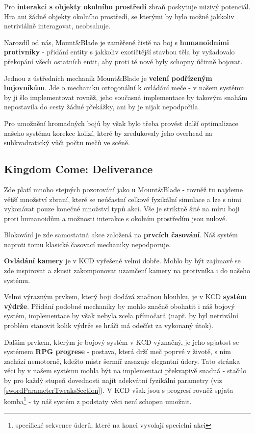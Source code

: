 Pro \textbf{interakci s objekty okolního prostředí} zbraň poskytuje mizivý potenciál. Hra ani žádné objekty okolního prostředí, se kterými by bylo možné jakkoliv netriviálně interagovat, neobsahuje.

Narozdíl od nás, Mount\&Blade je zaměřené čistě na boj s \textbf{humanoidními protivníky} - přidání entity s jakkoliv exotičtější stavbou těla by vyžadovalo překopání všech ostatních entit, aby proti té nové byly schopny účinně bojovat.


Jednou z ústředních mechanik Mount\&Blade je \textbf{velení podřízeným bojovníkům}. Jde o mechaniku ortogonální k ovládání meče - v našem systému by ji šlo implementovat rovněž, jeho současná implementace by takovým snahám nepostavila do cesty žádné překážky, ani by je nijak nepodpořila.

Pro umožnění hromadných bojů by však bylo třeba provést další optimalizace našeho systému korekce kolizí, které by zredukovaly jeho overhead na subkvadratický vůči počtu mečů ve scéně. 




\subsection{Kingdom Come: Deliverance}

Zde platí mnoho stejných pozorování jako u Mount\&Blade - rovněž tu najdeme větší množství zbraní, které se neúčastní celkové fyzikální simulace a lze s nimi vykonávat pouze konečné množství typů akcí. Vše je striktně šité na míru boji proti humanoidům a možnosti interakce s okolním prostředím jsou nulové.

Blokování je zde samostatná akce založená na \textbf{prvcích časování}. Náš systém naproti tomu klasické časovací mechaniky nepodporuje.

\textbf{Ovládání kamery} je v \acl{KCD} vyřešené velmi dobře. Mohlo by být zajímavé se zde inspirovat a zkusit zakomponovat uzamčení kamery na protivníka i do našeho systému.

Velmi výrazným prvkem, který boji dodává značnou hloubku, je v \acl{KCD} \textbf{systém výdrže}. Přidání podobné mechaniky by mohlo značně obohatit i náš bojový systém, implementace by však nebyla zcela přímočará (např. by byl netrivální problém stanovit kolik výdrže se hráči má odečíst za vykonaný útok).

Dalším prvkem, kterým je bojový systém v \acl{KCD} význačný, je jeho spjatost se systémem \textbf{\acs{RPG} progrese} - postava, která drží meč poprvé v životě, s ním zachází nemotorně, kdežto mistr šermíř zasazuje elegantní údery. Tato stránka věci by v našem systému mohla být na implementaci překvapivě snadná - stačilo by pro každý stupeň dovednosti najít adekvátní fyzikální parametry (viz \ref{swordParameterTweaksSection}). V \acl{KCD} však jsou s progresí rovněž spjata komba\footnote{specifické sekvence úderů, které na konci vyvolají specielní akci} - ty náš systém z podstaty věci není schopen umožnit.  

